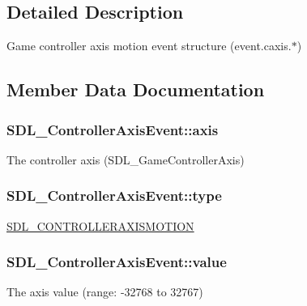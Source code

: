 \subsection{Detailed Description}
Game controller axis motion event structure (event.\+caxis.$\ast$) 

\subsection{Member Data Documentation}
\hypertarget{struct_s_d_l___controller_axis_event_aba6543c143521aebce06a41a8cf79db0}{}
\subsubsection[{axis}]{ S\+D\+L\+\_\+\+Controller\+Axis\+Event\+::axis}\label{struct_s_d_l___controller_axis_event_aba6543c143521aebce06a41a8cf79db0}
The controller axis (S\+D\+L\+\_\+\+Game\+Controller\+Axis) \hypertarget{struct_s_d_l___controller_axis_event_aa904b61e4763d28d887cf8afcc3cbb7c}{}
\subsubsection[{type}]{ S\+D\+L\+\_\+\+Controller\+Axis\+Event\+::type}\label{struct_s_d_l___controller_axis_event_aa904b61e4763d28d887cf8afcc3cbb7c}
\hyperlink{_s_d_l__events_8h_a3b589e89be6b35c02e0dd34a55f3fccaaca6330126f4126f6a45454fa046c25f3}{S\+D\+L\+\_\+\+C\+O\+N\+T\+R\+O\+L\+L\+E\+R\+A\+X\+I\+S\+M\+O\+T\+I\+O\+N} \hypertarget{struct_s_d_l___controller_axis_event_a1ed7f14255ed01b982d40a38791d475a}{}
\subsubsection[{value}]{ S\+D\+L\+\_\+\+Controller\+Axis\+Event\+::value}\label{struct_s_d_l___controller_axis_event_a1ed7f14255ed01b982d40a38791d475a}
The axis value (range\+: -\/32768 to 32767) \hypertarget{struct_s_d_l___controller_axis_event_a07087f68ea9d64b50047d65312ee7b94}{}
